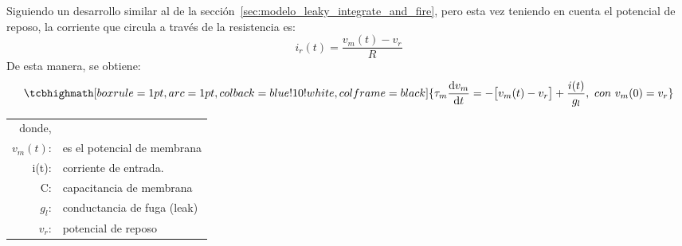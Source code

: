 \newpage
Siguiendo un desarrollo similar al de la sección~\ref{sec:modelo_leaky_integrate_and_fire}, pero esta vez teniendo en cuenta el potencial de reposo, la corriente que circula a través de la resistencia es:
\begin{equation}\label{eq:corriente_resistencia_fuga}
    \boxed{i_r(t)= \frac{v_m(t)-v_r}{R}}    
\end{equation}
De esta manera, se obtiene\cite{Kuhn2345}:
\begin{equation}\label{eq:ecuacion_diferncial_koch}
    \tcbhighmath[boxrule=1pt,arc=1pt,colback=blue!10!white,colframe=black]{\tau_m \dv{v_m}{t} = -\big[v_m(t) - v_r\big] + \frac{i(t)}{g_l},\ con\ v_m(0)= v_r}
\end{equation}
\begin{center}
\begin{tabular}{ r l}
\footnotesize{donde,}&\\
 \footnotesize{$v_m(t)$:}& \footnotesize{es el potencial de membrana}\\ 
 \footnotesize{i(t)}:& \footnotesize{corriente de entrada.}\\
 \footnotesize{C:}& \footnotesize{capacitancia de membrana}\\
 \footnotesize{$g_l$}:& \footnotesize{conductancia de fuga (leak)}\\
 \footnotesize{$v_r$:}& \footnotesize{potencial de reposo}
\end{tabular}
\end{center}
